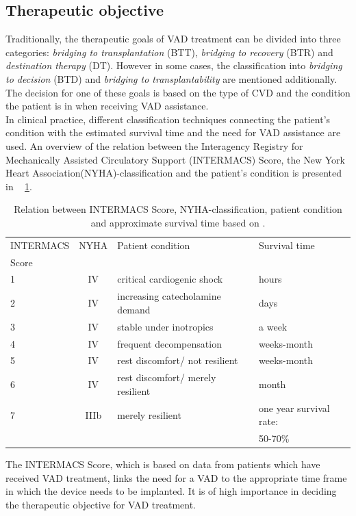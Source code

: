 \subsection{Therapeutic objective}
Traditionally, the therapeutic goals of VAD treatment can be divided into three categories: \textit{bridging to transplantation} (BTT), \textit{bridging to recovery} (BTR) and \textit{destination therapy} (DT). However in some cases, the classification into \textit{bridging to decision} (BTD) and \textit{bridging to transplantability} are mentioned additionally. The decision for one of these goals is based on the type of CVD and the condition the patient is in when receiving VAD assistance. \cite{VAD6}
\\In clinical practice, different classification techniques connecting the patient's condition with the estimated survival time and the need for VAD assistance are used. An overview of the relation between the Interagency Registry for Mechanically Assisted Circulatory Support (INTERMACS) Score, the New York Heart Association(NYHA)-classification and the patient's condition is presented in \tablename~ \ref{tab:Table1}.
\begin{table}[ht]
  \begin{tabularx}{\textwidth}{l|c|l|l}
    \toprule
    INTERMACS & NYHA & Patient condition & Survival time  \\
    Score & & &\\
    \midrule
    1 & IV & critical cardiogenic shock & hours \\
    2 & IV & increasing catecholamine demand & days \\
    3 & IV & stable under inotropics & a week \\
    4 & IV & frequent decompensation & weeks-month \\
    5 & IV & rest discomfort/ not resilient & weeks-month \\
    6 & IV & rest discomfort/ merely resilient & month \\
    7 & IIIb & merely resilient & one year survival rate: \\
     & & & 50-70\% \\
     \bottomrule
  \end{tabularx}
  \caption[Relation between INTERMACS Score and NYHA-classification]{Relation between INTERMACS Score, NYHA-classification, patient condition and approximate survival time based on \cite{VAD5}.}
  \label{tab:Table1}
\end{table}
The INTERMACS Score, which is based on data from patients which have received VAD treatment, links the need for a VAD to the appropriate time frame in which the device needs to be implanted. It is of high importance in deciding the therapeutic objective for VAD treatment. \cite{VAD7}

